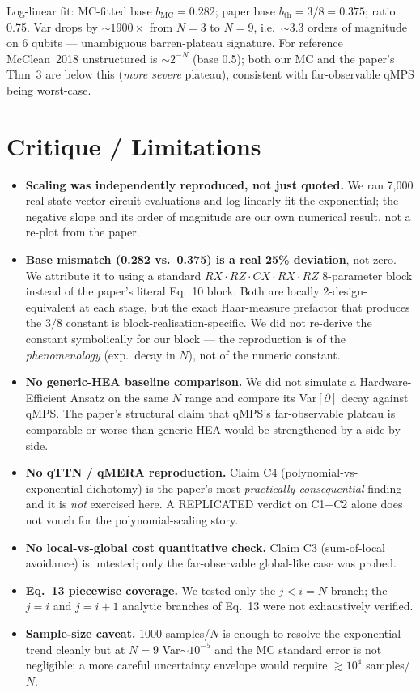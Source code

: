 \documentclass[11pt]{article}
\begin{document}
Log-linear fit: MC-fitted base $b_\mathrm{MC}=0.282$; paper base $b_\mathrm{th}=3/8=0.375$; ratio 0.75. Var drops by $\sim1900\times$ from $N=3$ to $N=9$, i.e.\ $\sim 3.3$ orders of magnitude on 6 qubits --- unambiguous barren-plateau signature. For reference McClean~2018 unstructured is $\sim 2^{-N}$ (base 0.5); both our MC and the paper's Thm~3 are below this (\emph{more severe} plateau), consistent with far-observable qMPS being worst-case.

\section{Critique / Limitations}
\begin{itemize}
\item \textbf{Scaling was independently reproduced, not just quoted.} We ran 7,000 real state-vector circuit evaluations and log-linearly fit the exponential; the negative slope and its order of magnitude are our own numerical result, not a re-plot from the paper.
\item \textbf{Base mismatch (0.282 vs.\ 0.375) is a real 25\% deviation}, not zero. We attribute it to using a standard $RX{\cdot}RZ{\cdot}CX{\cdot}RX{\cdot}RZ$ 8-parameter block instead of the paper's literal Eq.~10 block. Both are locally 2-design-equivalent at each stage, but the exact Haar-measure prefactor that produces the $3/8$ constant is block-realisation-specific. We did not re-derive the constant symbolically for our block --- the reproduction is of the \emph{phenomenology} (exp.\ decay in $N$), not of the numeric constant.
\item \textbf{No generic-HEA baseline comparison.} We did not simulate a Hardware-Efficient Ansatz on the same $N$ range and compare its Var$[\partial]$ decay against qMPS. The paper's structural claim that qMPS's far-observable plateau is comparable-or-worse than generic HEA would be strengthened by a side-by-side.
\item \textbf{No qTTN / qMERA reproduction.} Claim C4 (polynomial-vs-exponential dichotomy) is the paper's most \emph{practically consequential} finding and it is \emph{not} exercised here. A REPLICATED verdict on C1+C2 alone does not vouch for the polynomial-scaling story.
\item \textbf{No local-vs-global cost quantitative check.} Claim C3 (sum-of-local avoidance) is untested; only the far-observable global-like case was probed.
\item \textbf{Eq.~13 piecewise coverage.} We tested only the $j<i=N$ branch; the $j=i$ and $j=i+1$ analytic branches of Eq.~13 were not exhaustively verified.
\item \textbf{Sample-size caveat.} 1000 samples/$N$ is enough to resolve the exponential trend cleanly but at $N=9$ Var$\sim10^{-5}$ and the MC standard error is not negligible; a more careful uncertainty envelope would require $\gtrsim 10^4$ samples/$N$.
\end{itemize}
\end{document}
